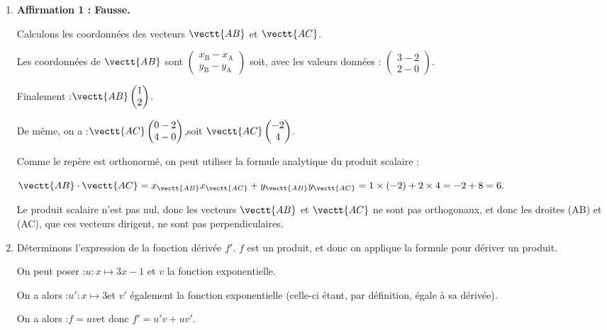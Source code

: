 \begin{enumerate}
	\item \textbf{Affirmation 1 : Fausse.}

	Calculons les coordonnées des vecteurs $\vectt{AB}$ et $\vectt{AC}$.

	Les coordonnées de $\vectt{AB}$ sont \quad $\begin{pmatrix}x_{\mathrm{B}} - x_{\mathrm{A}}\\ y_{\mathrm{B}} - y_{\mathrm{A}} \end{pmatrix} $
	\quad soit, avec les valeurs données : \quad $\begin{pmatrix} 3 - 2\\2-0 \end{pmatrix} $.

	Finalement :\quad $\vectt{AB} \begin{pmatrix} 1\\2 \end{pmatrix} $.

	De même, on a :\quad $\vectt{AC} \begin{pmatrix} 0 - 2\\4 - 0 \end{pmatrix} $,\quad soit \quad $\vectt{AC} \begin{pmatrix} -2\\4 \end{pmatrix} $.

	Comme le repère est orthonormé, on peut utiliser la formule analytique du produit scalaire :

	$\vectt{AB}\cdot\vectt{AC} = x_{\vectt{AB}}x_{\vectt{AC}} + y_{\vectt{AB}}y_{\vectt{AC}} = 1 \times (-2) + 2 \times 4 = -2 + 8 = 6.$

	Le produit scalaire n'est pas nul, donc les vecteurs $\vectt{AB}$ et $\vectt{AC}$ ne sont pas orthogonaux, et donc les droites (AB) et (AC), que ces vecteurs dirigent, ne sont pas perpendiculaires.

	\item Déterminons l'expression de la fonction dérivée $f'$. $f$ est un produit, et donc on applique la formule pour dériver un produit.

On peut poser :\quad $u : x \longmapsto 3x - 1$ \quad et $v$ la fonction exponentielle.

On a alors :\quad $u': x \longmapsto 3$\quad et $v'$ également la fonction exponentielle (celle-ci étant, par définition, égale à sa dérivée).

On a alors :\quad $f = uv$\quad et donc \quad $f' = u'v + uv'$.


\end{enumerate}
